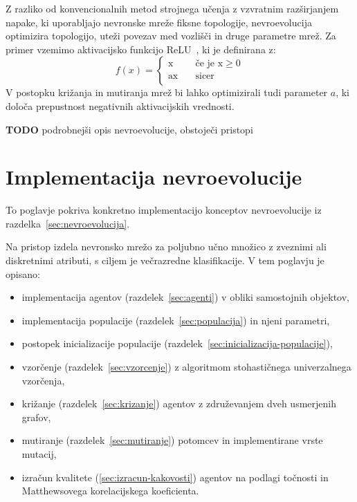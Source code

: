 \documentclass[a4paper,12pt,openright]{book}
\begin{document}
    Z razliko od konvencionalnih metod strojnega učenja z vzvratnim raz\-šir\-ja\-njem napake, ki uporabljajo nevronske mreže
    fiksne topologije, nevroevolucija optimizira topologijo, uteži povezav med vozlišči in druge parametre mrež.
    Za primer vzemimo aktivacijsko funkcijo ReLU~\cite{he2015delving}, ki je definirana z:
    \begin{equation}
        f(x)=
        \begin{cases}
            \text{x} & \quad\text{če je x}\ge0\\
            \text{ax} & \quad\text{sicer}\\
        \end{cases}
        \label{eq:parametric_relu}
    \end{equation}
    V postopku križanja in mutiranja mrež bi lahko optimizirali tudi parameter $a$, ki določa prepustnost negativnih aktivacijskih vrednosti.

    \textbf{TODO} podrobnejši opis nevroevolucije, obstoječi pristopi



    \chapter{Implementacija nevroevolucije}\label{ch:implementacija-nevroevolucije}
    To poglavje pokriva konkretno implementacijo konceptov nevroevolucije iz razdelka~\ref{sec:nevroevolucija}.

    Na pristop izdela nevronsko mrežo za poljubno učno množico z zveznimi ali diskretnimi atributi, s ciljem je večrazredne klasifikacije.
    V tem poglavju je opisano:
    \begin{itemize}
        \item implementacija agentov (razdelek~\ref{sec:agenti}) v obliki samostojnih objektov,
        \item implementacija populacije (razdelek~\ref{sec:populacija}) in njeni parametri,
        \item postopek inicializacije populacije (razdelek~\ref{sec:inicializacija-populacije}),
        \item vzorčenje (razdelek~\ref{sec:vzorcenje}) z algoritmom stohastičnega univerzalnega vzor\-če\-nja,
        \item križanje (razdelek~\ref{sec:krizanje}) agentov z združevanjem dveh usmerjenih grafov,
        \item mutiranje (razdelek~\ref{sec:mutiranje}) potomcev in implementirane vrste mutacij,
        \item izračun kvalitete (\ref{sec:izracun-kakovosti}) agentov na podlagi točnosti in Matthewsovega korelacijskega koeficienta.
    \end{itemize}
\end{document}
